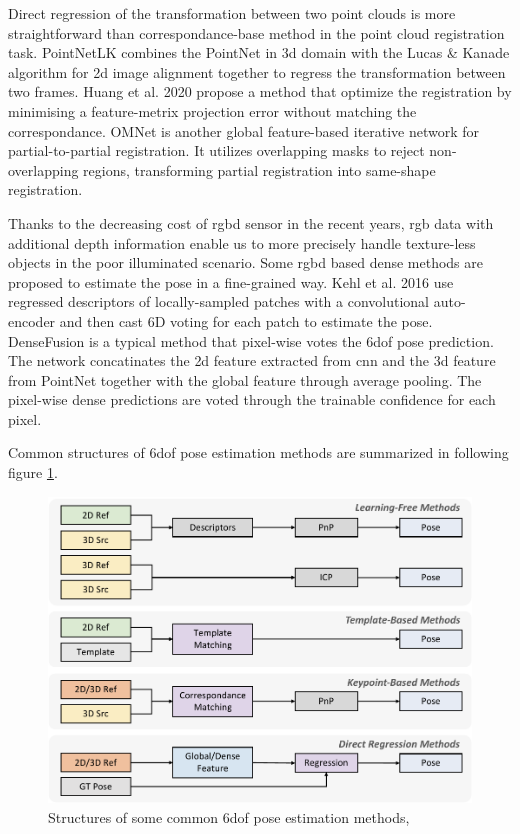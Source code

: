 \documentclass[12pt,DIV14,BCOR12mm,a4paper,footinclude=false,headinclude,parskip=half-,twoside,openright,cleardoublepage=empty,toc=index,bibliography=totoc,listof=totoc]{scrreprt}
\numberwithin{equation}{chapter}
\begin{document}
Direct regression of the transformation between two point clouds is more straightforward than correspondance-base method in the point cloud registration task. PointNetLK \cite{aoki2019pointnetlk} combines the PointNet in \gls{3d} domain with the Lucas \& Kanade algorithm \cite{Lucas1981AnII} for \gls{2d} image alignment together to regress the transformation between two frames. Huang et al. 2020 \cite{huang2020featuremetric} propose a method that optimize the registration by minimising a feature-metrix projection error without matching the correspondance. OMNet \cite{xu2021omnet} is another global feature-based iterative network for partial-to-partial registration. It utilizes overlapping masks to reject non-overlapping regions, transforming partial registration into same-shape registration.

Thanks to the decreasing cost of \gls{rgbd} sensor in the recent years, \gls{rgb} data with additional depth information enable us to more precisely handle texture-less objects in the poor illuminated scenario. Some \gls{rgbd} based dense methods are proposed to estimate the pose in a fine-grained way. Kehl et al. 2016 \cite{kehl2016deep} use regressed descriptors of locally-sampled patches with a convolutional auto-encoder and then cast 6D voting for each patch to estimate the pose. DenseFusion \cite{wang2019densefusion} is a typical method that pixel-wise votes the \gls{6dof} pose prediction. The network concatinates the \gls{2d} feature extracted from \gls{cnn} and the \gls{3d} feature from PointNet together with the global feature through average pooling. The pixel-wise dense predictions are voted through the trainable confidence for each pixel. 

Common structures of \gls{6dof} pose estimation methods are summarized in following figure \ref{img:pose_methods}.
\begin{figure}[h]
	\centering
	\includegraphics[width=1.\textwidth]{img/pose_methods.pdf}
	\caption{Structures of some common \gls{6dof} pose estimation methods,}
	\label{img:pose_methods}
\end{figure}
\end{document}
